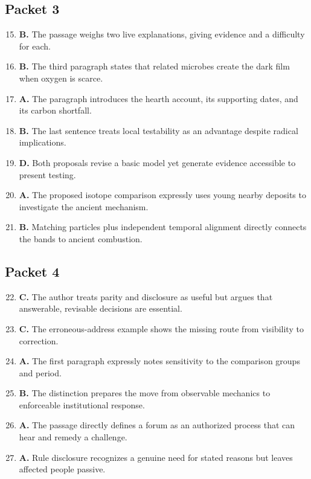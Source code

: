 \subsection*{Packet 3}
\begin{enumerate}\setcounter{enumi}{14}
\item \textbf{B.} The passage weighs two live explanations, giving evidence and a difficulty for each.
\item \textbf{B.} The third paragraph states that related microbes create the dark film when oxygen is scarce.
\item \textbf{A.} The paragraph introduces the hearth account, its supporting dates, and its carbon shortfall.
\item \textbf{B.} The last sentence treats local testability as an advantage despite radical implications.
\item \textbf{D.} Both proposals revise a basic model yet generate evidence accessible to present testing.
\item \textbf{A.} The proposed isotope comparison expressly uses young nearby deposits to investigate the ancient mechanism.
\item \textbf{B.} Matching particles plus independent temporal alignment directly connects the bands to ancient combustion.
\end{enumerate}

\subsection*{Packet 4}
\begin{enumerate}\setcounter{enumi}{21}
\item \textbf{C.} The author treats parity and disclosure as useful but argues that answerable, revisable decisions are essential.
\item \textbf{C.} The erroneous-address example shows the missing route from visibility to correction.
\item \textbf{A.} The first paragraph expressly notes sensitivity to the comparison groups and period.
\item \textbf{B.} The distinction prepares the move from observable mechanics to enforceable institutional response.
\item \textbf{A.} The passage directly defines a forum as an authorized process that can hear and remedy a challenge.
\item \textbf{A.} Rule disclosure recognizes a genuine need for stated reasons but leaves affected people passive.
\end{enumerate}

\endgroup
